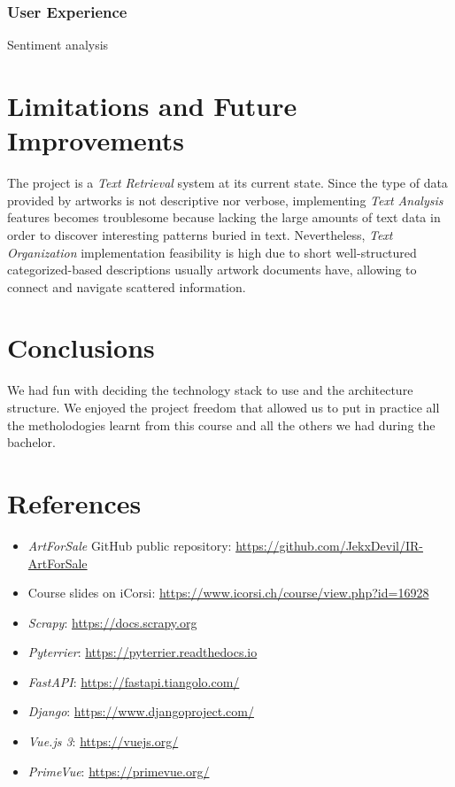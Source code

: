 \documentclass[12pt]{spieman}  %
\begin{document}
\begin{spacing}{1}
    \subsubsection{User Experience}\label{sec:ux}
    Sentiment analysis


    \section{Limitations and Future Improvements}

    The project is a \textit{Text Retrieval} system at its current state.
    Since the type of data provided by artworks is not descriptive nor verbose,
    implementing \textit{Text Analysis} features becomes troublesome because lacking the large amounts of
    text data in order to discover interesting patterns buried in text.
    Nevertheless, \textit{Text Organization} implementation feasibility is high due to
    short well-structured categorized-based descriptions usually artwork documents have,
    allowing to connect and navigate scattered information.

    \section{Conclusions}
    We had fun with deciding the technology stack to use and the architecture structure.
    We enjoyed the project freedom that allowed us to put in practice all the metholodogies
    learnt from this course and all the others we had during the bachelor.

    \section{References}\label{sec:references}
    \begin{itemize}
        \item \textit{ArtForSale} GitHub public repository: \url{https://github.com/JekxDevil/IR-ArtForSale}
        \item Course slides on iCorsi: \url{https://www.icorsi.ch/course/view.php?id=16928}
        \item \textit{Scrapy}: \url{https://docs.scrapy.org}
        \item \textit{Pyterrier}: \url{https://pyterrier.readthedocs.io}
        \item \textit{FastAPI}: \url{https://fastapi.tiangolo.com/}
        \item \textit{Django}: \url{https://www.djangoproject.com/}
        \item \textit{Vue.js 3}: \url{https://vuejs.org/}
        \item \textit{PrimeVue}: \url{https://primevue.org/}
    \end{itemize}

\end{spacing}
\end{document}
